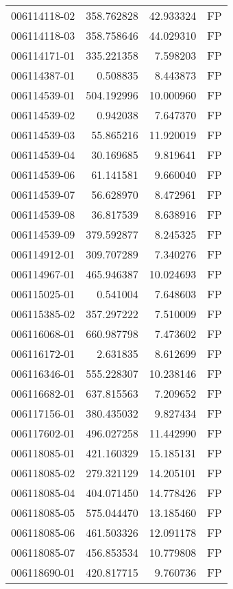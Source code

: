 \begin{tabular}{lrrl}
006114118-02 &  358.762828 &    42.933324 &   FP \\
006114118-03 &  358.758646 &    44.029310 &   FP \\
006114171-01 &  335.221358 &     7.598203 &   FP \\
006114387-01 &    0.508835 &     8.443873 &   FP \\
006114539-01 &  504.192996 &    10.000960 &   FP \\
006114539-02 &    0.942038 &     7.647370 &   FP \\
006114539-03 &   55.865216 &    11.920019 &   FP \\
006114539-04 &   30.169685 &     9.819641 &   FP \\
006114539-06 &   61.141581 &     9.660040 &   FP \\
006114539-07 &   56.628970 &     8.472961 &   FP \\
006114539-08 &   36.817539 &     8.638916 &   FP \\
006114539-09 &  379.592877 &     8.245325 &   FP \\
006114912-01 &  309.707289 &     7.340276 &   FP \\
006114967-01 &  465.946387 &    10.024693 &   FP \\
006115025-01 &    0.541004 &     7.648603 &   FP \\
006115385-02 &  357.297222 &     7.510009 &   FP \\
006116068-01 &  660.987798 &     7.473602 &   FP \\
006116172-01 &    2.631835 &     8.612699 &   FP \\
006116346-01 &  555.228307 &    10.238146 &   FP \\
006116682-01 &  637.815563 &     7.209652 &   FP \\
006117156-01 &  380.435032 &     9.827434 &   FP \\
006117602-01 &  496.027258 &    11.442990 &   FP \\
006118085-01 &  421.160329 &    15.185131 &   FP \\
006118085-02 &  279.321129 &    14.205101 &   FP \\
006118085-04 &  404.071450 &    14.778426 &   FP \\
006118085-05 &  575.044470 &    13.185460 &   FP \\
006118085-06 &  461.503326 &    12.091178 &   FP \\
006118085-07 &  456.853534 &    10.779808 &   FP \\
006118690-01 &  420.817715 &     9.760736 &   FP \\

\end{tabular}

